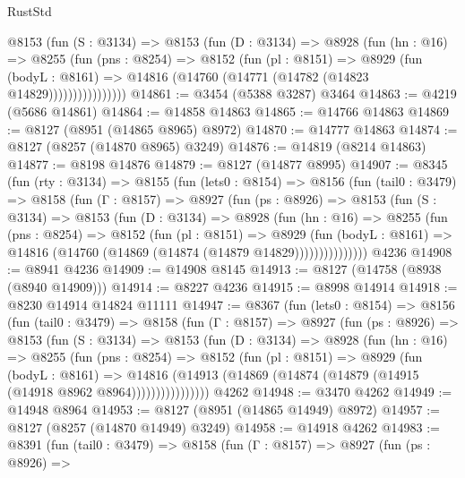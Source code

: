 \begin{lexlean}{RustStd}
\begin{coremodule}
              @8153
                (fun (S : @3134) =>
                @8153
                  (fun (D : @3134) =>
                  @8928
                    (fun (hn : @16) =>
                    @8255
                      (fun (pns : @8254) =>
                      @8152
                        (fun (pl : @8151) =>
                        @8929
                          (fun (bodyL : @8161) =>
                          @14816 (@14760 (@14771 (@14782 (@14823 @14829))))))))))))))))
@14861 := @3454 (@5388 @3287) @3464
@14863 := @4219 (@5686 @14861)
@14864 := @14858 @14863
@14865 := @14766 @14863
@14869 := @8127 (@8951 (@14865 @8965) @8972)
@14870 := @14777 @14863
@14874 := @8127 (@8257 (@14870 @8965) @3249)
@14876 := @14819 (@8214 @14863)
@14877 := @8198 @14876
@14879 := @8127 (@14877 @8995)
@14907 := @8345
    (fun (rty : @3134) =>
    @8155
      (fun (lets0 : @8154) =>
      @8156
        (fun (tail0 : @3479) =>
        @8158
          (fun (Γ : @8157) =>
          @8927
            (fun (ps : @8926) =>
            @8153
              (fun (S : @3134) =>
              @8153
                (fun (D : @3134) =>
                @8928
                  (fun (hn : @16) =>
                  @8255
                    (fun (pns : @8254) =>
                    @8152
                      (fun (pl : @8151) =>
                      @8929
                        (fun (bodyL : @8161) =>
                        @14816 (@14760 (@14869 (@14874 (@14879 @14829)))))))))))))))
    @4236
@14908 := @8941 @4236
@14909 := @14908 @8145
@14913 := @8127 (@14758 (@8938 (@8940 @14909)))
@14914 := @8227 @4236
@14915 := @8998 @14914
@14918 := @8230 @14914 @14824 @11111
@14947 := @8367
    (fun (lets0 : @8154) =>
    @8156
      (fun (tail0 : @3479) =>
      @8158
        (fun (Γ : @8157) =>
        @8927
          (fun (ps : @8926) =>
          @8153
            (fun (S : @3134) =>
            @8153
              (fun (D : @3134) =>
              @8928
                (fun (hn : @16) =>
                @8255
                  (fun (pns : @8254) =>
                  @8152
                    (fun (pl : @8151) =>
                    @8929
                      (fun (bodyL : @8161) =>
                      @14816
                        (@14913 (@14869 (@14874 (@14879 (@14915 (@14918 @8962 @8964))))))))))))))))
    @4262
@14948 := @3470 @4262
@14949 := @14948 @8964
@14953 := @8127 (@8951 (@14865 @14949) @8972)
@14957 := @8127 (@8257 (@14870 @14949) @3249)
@14958 := @14918 @4262
@14983 := @8391
    (fun (tail0 : @3479) =>
    @8158
      (fun (Γ : @8157) =>
      @8927
        (fun (ps : @8926) =>

\end{coremodule}
\end{lexlean}
